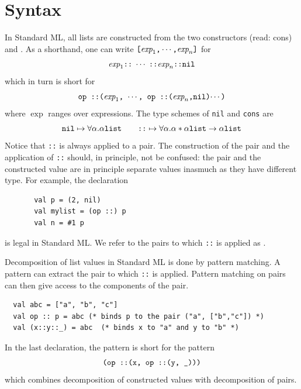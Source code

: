 \documentclass[12pt]{book}
\begin{document}
\section{Syntax}
\label{lsyn.sec}
In Standard ML, all lists are constructed 
from the two constructors \boxml{::} (read: cons)
and .   
As a shorthand, one can write $\hbox{\tt [}\hbox{\it exp}_1\hbox{\tt ,}\cdots
\hbox{\tt ,}\hbox{\it exp}_n\hbox{\tt ]}$ for
$$ \hbox{\it exp}_1\hbox{\tt ::}\; \cdots\; \hbox{\tt ::} \hbox{\it exp}_n\hbox{\tt ::}\hbox{\tt nil}$$
which in turn is short for
$$ \hbox{\tt op ::($\hbox{\it exp}_1$, $\cdots$, op ::($\hbox{\it exp}_n$,nil)$\cdots$)}$$
where $\exp$ ranges over expressions. 
The type schemes of {\tt nil} and {\tt cons} are
$$\hbox{\tt nil}\mapsto\forall\alpha.\alpha\hbox{\tt list}\qquad
  \hbox{\tt ::} \mapsto\forall\alpha.\alpha\ast\alpha\hbox{\tt list}\to\alpha\hbox{\tt list}
$$
Notice that  {\tt ::} is always applied to a pair. The construction
of the pair and the application of {\tt ::} should, in principle,  not be 
confused: the pair and the
constructed value are in principle separate values inasmuch as they have different
type.
For example, the declaration
\begin{verbatim}
       val p = (2, nil)
       val mylist = (op ::) p
       val n = #1 p
\end{verbatim}
is legal in Standard ML. We refer to the pairs to which {\tt ::} is applied
as .

Decomposition of list values in Standard ML is done by pattern matching.
A pattern can extract the pair to which {\tt ::} is applied. Pattern matching
on pairs can then give access to the components of the pair. 
\begin{verbatim}
  val abc = ["a", "b", "c"]
  val op :: p = abc (* binds p to the pair ("a", ["b","c"]) *)
  val (x::y::_) = abc  (* binds x to "a" and y to "b" *)
\end{verbatim}
In the last declaration, the pattern  is short for the pattern
$$\hbox{\tt (op ::(x, op ::(y, \_)))}$$ which combines decomposition of constructed
values with decomposition of pairs.
\end{document}

